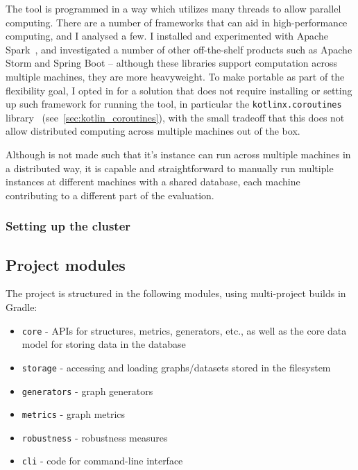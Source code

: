 The \graffs tool is programmed in a way which utilizes many threads to allow parallel computing.
There are a number of frameworks that can aid in high-performance computing, and I analysed a few.
I installed and experimented with Apache Spark~\cite{ZahariaApacheSparkUnified2016}, and investigated a number of other off-the-shelf products such as Apache Storm and Spring Boot -- although these libraries support computation across multiple machines, they are more heavyweight.
To make \graffs portable as part of the flexibility goal, I opted in for a solution that does not require installing or setting up such framework for running the tool, in particular the \texttt{kotlinx.coroutines} library~\cite{TorresLearningConcurrencyKotlin2018} (see~\autoref{sec:kotlin_coroutines}), with the small tradeoff that this does not allow distributed computing across multiple machines out of the box.

Although \graffs is not made such that it's instance can run across multiple machines in a distributed way, it is capable and straightforward to manually run multiple instances at different machines with a shared database, each machine contributing to a different part of the evaluation.

\subsubsection*{Setting up the cluster}

\subsection{Project modules}

The project is structured in the following modules, using multi-project builds in Gradle:
\begin{itemize}
    \item \texttt{core} - APIs for structures, metrics, generators, etc., as well as the core data model for storing data in the database
    \item \texttt{storage} - accessing and loading graphs/datasets stored in the filesystem
    \item \texttt{generators} - graph generators
    \item \texttt{metrics} - graph metrics
    \item \texttt{robustness} - robustness measures
    \item \texttt{cli} - code for command-line interface
\end{itemize}


